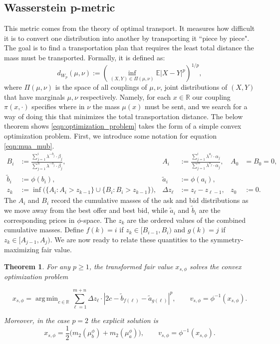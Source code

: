 \documentclass[11pt]{article}
\theoremstyle{plain}
\newtheorem{theorem}{Theorem}[section]
\theoremstyle{definition}
\numberwithin{equation}{section}
\newcommand{\R}{\mathbb{R}}
\newcommand{\E}{\mathbb{E}}
\DeclareMathOperator*{\argmin}{arg\,min}
\begin{document}
\subsection{Wasserstein p-metric}

This metric comes from the theory of optimal transport. It measures how
 difficult it is to convert one distribution into another by transporting
 it ``piece by piece". The goal is to find a transportation plan that
 requires the least total distance the mass must be transported.
 Formally, it is defined as:
%
\[d_{W_p}(\mu, \nu) := \left( \inf_{(X,Y) \in \Pi(\mu, \nu)} \E |X-Y|^p \right)^{1/p},\]
%
\noindent where $\Pi(\mu, \nu)$ is the space of all couplings of $\mu, \nu$, joint distributions of $(X,Y)$ that have marginals $\mu, \nu$ respectively. Namely, for each $x \in \R$ our coupling $\pi(x, \cdot)$ specifies where in $\nu$ the mass $\mu(x)$ must be sent, and we search for a way of doing this that minimizes the total transportation distance. The below theorem shows \eqref{eqn:optimization_problem} takes the form of a simple convex optimization problem. First, we introduce some notation for equation \eqref{eqn:mua_mub}.
%
\begin{align*}
    B_i &:= \frac{\sum_{j=1}^i\lambda^{-b_j} \cdot \beta_j}{\sum_{j=1}^n \lambda^{-b_j} \cdot \beta_j},
    &A_i &:= \frac{\sum_{j=1}^i\lambda^{a_j} \cdot \alpha_j}{\sum_{j=1}^m \lambda^{a_j} \cdot \alpha_j},
    &A_0&=B_0=0,\\
    \widetilde b_i&:=\phi(b_i),
    &\widetilde a_i&:=\phi(a_i),\\
    z_k &:= \inf \bigl(\{A_i:A_i>z_{k-1}\}\cup\{B_i:B_i>z_{k-1}\}\bigr),
    &\Delta z_\ell&:=z_\ell-z_{\ell-1},
    &z_0&:=0.
\end{align*}
%
\noindent The $A_i$ and $B_i$ record the cumulative masses of the ask and bid
distributions as we move away from the best offer and best bid, while
$\widetilde a_i$ and $\widetilde b_i$ are the corresponding prices in
$\phi$-space. The $z_k$ are the ordered values of the combined cumulative
masses. Define $f(k)=i$ if $z_k\in[B_{i-1},B_i)$ and $g(k)=j$ if
$z_k\in[A_{j-1},A_j)$. We are now ready to relate these quantities to the
symmetry-maximizing fair value.
%
\begin{theorem}
    For any $p \geq 1$, the transformed fair value $x_{s,\phi}$ solves the convex optimization problem

    \begin{equation}
    x_{s,\phi} = \argmin_{c \in \mathbb R} \sum_{\ell = 1}^{m+n} \Delta z_\ell \cdot
    |2c - \widetilde b_{f(\ell)} - \widetilde a_{g(\ell)}|^p,
    \qquad v_{s,\phi}=\phi^{-1}(x_{s,\phi}).
    \end{equation}

    \noindent Moreover, in the case $p = 2$ the explicit solution is
    \begin{equation}
        x_{s,\phi}=\frac{1}{2}\Big(m_2(\mu_b^\phi)+m_2(\mu_a^\phi)\Big),
        \qquad v_{s,\phi}=\phi^{-1}(x_{s,\phi}).
        \label{eqn:explicit_soln_sym_fv}
    \end{equation}
    \label{thm:wasserstein_solution}
\end{theorem}
\end{document}
